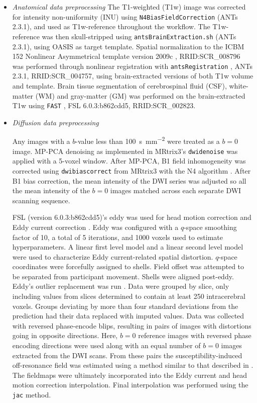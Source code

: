 \documentclass[9pt,lineno]{elife}
\begin{document}
\begin{itemize}

\item {\it Anatomical data preprocessing}
The T1-weighted (T1w) image was corrected for intensity non-uniformity (INU)
using \texttt{N4BiasFieldCorrection} \citep{n4} (ANTs 2.3.1), and used as
T1w-reference throughout the workflow. The T1w-reference was then skull-stripped
using \texttt{antsBrainExtraction.sh} (ANTs 2.3.1), using OASIS as target
template. Spatial normalization to the ICBM 152 Nonlinear Asymmetrical template
version 2009c \citep{mni}, RRID:SCR\_008796 was performed through nonlinear
registration with \texttt{antsRegistration} \citep{ants}, ANTs 2.3.1,
RRID:SCR\_004757, using brain-extracted versions of both T1w volume and
template. Brain tissue segmentation of cerebrospinal fluid (CSF), white-matter
(WM) and gray-matter (GM) was performed on the brain-extracted T1w using
\texttt{FAST} \citep{fsl-fast}, FSL 6.0.3:b862cdd5, RRID:SCR\_002823.

\item {\it Diffusion data preprocessing}

Any images with a $b$-value less than \qty{100}{\second \per \mm^{2}} were treated
as a $b=0$ image. MP-PCA denoising as implemented in MRtrix3's
\texttt{dwidenoise}\citep{dwidenoise1} was applied with a 5-voxel window. After
MP-PCA, B1 field inhomogeneity was corrected using \texttt{dwibiascorrect} from
MRtrix3 with the N4 algorithm \citep{n4}. After B1 bias correction, the mean
intensity of the DWI series was adjusted so all the mean intensity of the $b=0$
images matched across each separate DWI scanning sequence.

FSL (version 6.0.3:b862cdd5)'s eddy was used for head motion correction
and Eddy current correction \citep{anderssoneddy}. Eddy was configured
with a \(q\)-space smoothing factor of 10, a total of 5 iterations, and
\num{1000} voxels used to estimate hyperparameters. A linear first level model
and a linear second level model were used to characterize Eddy
current-related spatial distortion. \(q\)-space coordinates were
forcefully assigned to shells. Field offset was attempted to be
separated from participant movement. Shells were aligned post-eddy. Eddy's
outlier replacement was run \citep{eddyrepol}. Data were grouped by
slice, only including values from slices determined to contain at least
\num{250} intracerebral voxels. Groups deviating by more than four standard
deviations from the prediction had their data replaced with imputed
values. Data was collected with reversed phase-encode blips, resulting
in pairs of images with distortions going in opposite directions. Here,
$b=0$ reference images with reversed phase encoding directions were used
along with an equal number of $b=0$ images extracted from the DWI scans.
From these pairs the susceptibility-induced off-resonance field was
estimated using a method similar to that described in \citep{topup}. The
fieldmaps were ultimately incorporated into the Eddy current and head
motion correction interpolation. Final interpolation was performed using
the \texttt{jac} method.


\end{itemize}
\end{document}

